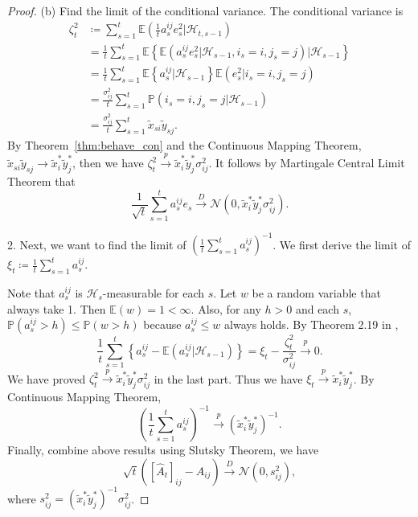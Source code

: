 \documentclass[12pt]{article}
\begin{document}
\begin{proof}
(b) Find the limit of the conditional variance. The conditional variance is
\begin{align*} 
    \zeta_t^2 &\coloneqq \sum_{s=1}^t \mathbb{E} \left(\frac{1}{t} a_s^{ij} e_s^2 \Big \vert \mathcal{H}_{t,s-1}\right) \\
    &= \frac{1}{t}\sum_{s=1}^t \mathbb{E} \left\{ \mathbb{E} \left(a_s^{ij} e_s^2\vert \mathcal{H}_{s-1}, i_s=i,j_s=j \right) \Big \vert \mathcal{H}_{s-1}\right\} \\
    &= \frac{1}{t}\sum_{s=1}^t \mathbb{E} \left\{a_s^{ij} \vert \mathcal{H}_{s-1}\right\} \mathbb{E} \left(e_s^2 \vert i_s=i,j_s=j \right)\\
    &= \frac{\sigma_{ij}^2}{t} \sum_{s=1}^t \mathbb{P}\left(i_s=i,j_s=j \vert \mathcal{H}_{s-1}\right) \\
    &= \frac{\sigma_{ij}^2}{t} \sum_{s=1}^t \widetilde{x}_{si} \widetilde{y}_{sj}.
\end{align*}
By Theorem~\ref{thm:behave_con} and the Continuous Mapping Theorem, $\widetilde{x}_{si} \widetilde{y}_{sj} \to \widetilde{x}_i^\ast \widetilde{y}_j^\ast$, then we have $\zeta_t^2 \stackrel{p}{\to} \widetilde{x}_i^\ast \widetilde{y}_j^\ast \sigma_{ij}^2$. It follows by Martingale Central Limit Theorem that 
\[
\frac{1}{\sqrt{t}} \sum_{s=1}^{t}a_s^{ij} e_s \stackrel{D}{\to} \mathcal{N}\left(0,\widetilde{x}_i^\ast \widetilde{y}_j^\ast \sigma_{ij}^2 \right).
\]

2. Next, we want to find the limit of $\left(\frac{1}{t}\sum_{s=1}^{t} a_s^{ij} \right)^{-1}$. We first derive the limit of $\xi_t \coloneqq\frac{1}{t}\sum_{s=1}^{t} a_s^{ij}$.

Note that $a_s^{ij}$ is $\mathcal{H}_s$-measurable for each $s$. Let $w$ be a random variable that always take 1. Then $\mathbb{E} (w) = 1 < \infty$. Also, for any $h >0$ and each $s$, $\mathbb{P}(a_s^{ij} > h) \le \mathbb{P}(w > h)$ because $a_s^{ij} \le w$ always holds. 
By Theorem 2.19 in \citet{hall1980martingale},
\begin{equation*}
    \frac{1}{t}\sum_{s=1}^{t} \left\{ a_s^{ij} - \mathbb{E}(a_s^{ij} \Big\vert \mathcal{H}_{s-1}) \right\} = \xi_t - \frac{\zeta_t^2}{\sigma_{ij}^2}  \stackrel{p}{\to} 0.
\end{equation*}
We have proved $\zeta_t^2 \stackrel{p}{\to} \widetilde{x}_i^\ast \widetilde{y}_j^\ast \sigma_{ij}^2$ in the last part. Thus we have $\xi_t \stackrel{p}{\to} \widetilde{x}_i^\ast \widetilde{y}_j^\ast$. By Continuous Mapping Theorem,
\begin{equation*}
    \left(\frac{1}{t}\sum_{s=1}^{t} a_s^{ij} \right)^{-1} \stackrel{p}{\to} \left(\widetilde{x}_i^\ast \widetilde{y}_j^\ast \right)^{-1}.
\end{equation*}
Finally, combine above results using Slutsky Theorem, we have
\begin{equation*}
    \sqrt{t}\left([\widehat{A}_t]_{ij} - A_{ij}\right) \stackrel{D}{\to} \mathcal{N}(0,s_{ij}^2),
\end{equation*}
where $s_{ij}^2 = \left(\widetilde{x}_i^\ast \widetilde{y}_j^\ast \right)^{-1} \sigma_{ij}^2$.


\end{proof}
\end{document}
